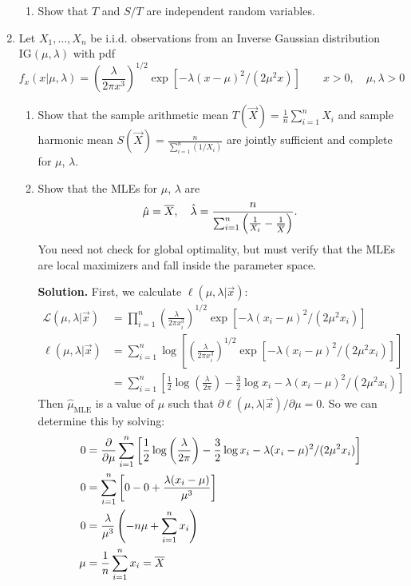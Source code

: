 \documentclass[titlepage]{article}
\begin{document}
\begin{enumerate}
\begin{enumerate}
  \item Show that $T$ and $S/T$ are independent random variables.
  \end{enumerate}

\item Let $X_1, \ldots, X_n$ be i.i.d. observations from an Inverse Gaussian distribution $\text{IG}(\mu, \lambda)$ with pdf
  \[f_x(x|\mu, \lambda) = \left(\frac{\lambda}{2\pi x^3}\right)^{1/2}\exp{[-\lambda(x - \mu)^2/(2\mu^2 x)]} \qquad x > 0, \quad \mu, \lambda > 0\]
  \begin{enumerate}
  \item Show that the sample arithmetic mean $T(\vec{X}) = \frac{1}{n}\sum_{i=1}^n X_i$ and sample harmonic mean $S(\vec{X}) = \frac{n}{\sum_{i=1}^n(1/X_i)}$ are jointly sufficient and complete for $\mu$, $\lambda$.

  \item Show that the MLEs for $\mu$, $\lambda$ are
    \[\hat{\mu} = \overline{X}, \quad \hat{\lambda} = \frac{n}{\sum_{i=1}^n\left(\frac{1}{X_i} - \frac{1}{\overline{X}}\right)}.\]
  You need not check for global optimality, but must verify that the MLEs are local maximizers and fall inside the parameter space.

  \textbf{Solution.} First, we calculate $\ell(\mu, \lambda | \vec{x})$:
  \[\begin{aligned}
  \mathcal{L}(\mu,\lambda | \vec{x}) &= \prod_{i=1}^n\left(\frac{\lambda}{2\pi x_i^3}\right)^{1/2}\exp{[-\lambda(x_i - \mu)^2/(2\mu^2 x_i)]}\\
  \ell(\mu,\lambda | \vec{x}) &= \sum_{i=1}^n \log\left[\left(\frac{\lambda}{2\pi x_i^3}\right)^{1/2}\exp{[-\lambda(x_i - \mu)^2/(2\mu^2 x_i)]}\right] \\
  &= \sum_{i=1}^n\left[\frac{1}{2}\log\left(\frac{\lambda}{2\pi}\right) - \frac{3}{2}\log{x_i} - \lambda(x_i - \mu)^2 / (2\mu^2 x_i)\right]
  \end{aligned}\]
  Then $\hat{\mu}_{\text{MLE}}$ is a value of $\mu$ such that $\partial \ell(\mu, \lambda | \vec{x})/\partial \mu = 0$. So we can determine this by solving:
  \[\begin{aligned}
  0 &= \frac{\partial}{\partial \mu} \sum_{i=1}^n\left[\frac{1}{2}\log\left(\frac{\lambda}{2\pi}\right) - \frac{3}{2}\log{x_i} - \lambda(x_i - \mu)^2 / (2\mu^2 x_i)\right] \\
  0 &= \sum_{i=1}^n \left[0 - 0 + \frac{\lambda(x_i - \mu)}{\mu^3}\right] \\
  0 &= \frac{\lambda}{\mu^3}\left(-n\mu + \sum_{i=1}^n x_i\right) \\
  \mu &= \frac{1}{n}\sum_{i=1}^n x_i = \overline{X}
  \end{aligned}\]


\end{enumerate}
\end{enumerate}
\end{document}
